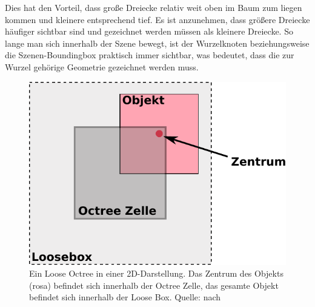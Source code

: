Dies hat den Vorteil, dass große Dreiecke relativ weit oben im Baum zum liegen kommen und kleinere entsprechend tief. Es ist anzunehmen, dass größere Dreiecke häufiger sichtbar sind und gezeichnet werden müssen als kleinere Dreiecke. So lange man sich innerhalb der Szene bewegt, ist der Wurzelknoten beziehungsweise die Szenen-Boundingbox praktisch immer sichtbar, was bedeutet, dass die zur Wurzel gehörige Geometrie gezeichnet werden muss.
\begin{figure}
 \centering
  \includegraphics[scale=0.8]{images/looseoctree.pdf}
  \caption{Ein Loose Octree in einer 2D-Darstellung. Das Zentrum des Objekts (rosa) befindet sich innerhalb der Octree Zelle, das gesamte Objekt befindet sich innerhalb der Loose Box. Quelle: nach}
 \label{fig:basics:looseoctree}
\end{figure}

